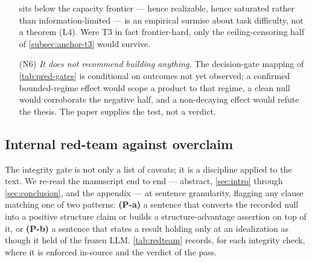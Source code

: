 \begin{enumerate}
    sits below the capacity frontier --- hence realizable, hence saturated
    rather than information-limited --- is an empirical surmise about task
    difficulty, not a theorem (L4). Were T3 in fact frontier-hard,
    only the ceiling-censoring half of \cref{subsec:anchor-t3} would survive.
  \item[(N6)] \emph{It does not recommend building anything.} The decision-gate
    mapping of \cref{tab:pred-gates} is conditional on outcomes not yet observed;
    a confirmed bounded-regime effect would scope a product to that regime, a
    clean null would corroborate the negative half, and a non-decaying effect
    would refute the thesis. The paper supplies the test, not a verdict.
\end{enumerate}

\subsection{Internal red-team against overclaim}
\label{subsec:lim-redteam}

The integrity gate is not only a list of caveats; it is a discipline applied to
the text. We re-read the manuscript end to end --- abstract, \cref{sec:intro}
through \cref{sec:conclusion}, and the appendix --- at sentence granularity,
flagging any clause matching one of two patterns: \textbf{(P-a)} a sentence that
converts the recorded null into a positive structure claim or builds a
structure-advantage assertion on top of it, or
\textbf{(P-b)} a sentence that states a result holding only at an idealization
as though it held of the frozen LLM. \cref{tab:redteam}
records, for each integrity check, where it is enforced in-source and the verdict of
the pass.

